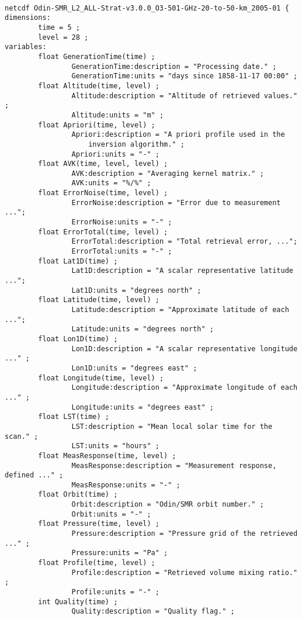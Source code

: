 \begin{verbatim}

netcdf Odin-SMR_L2_ALL-Strat-v3.0.0_O3-501-GHz-20-to-50-km_2005-01 {
dimensions:
        time = 5 ;
        level = 28 ;
variables:
        float GenerationTime(time) ;
                GenerationTime:description = "Processing date." ;
                GenerationTime:units = "days since 1858-11-17 00:00" ;
        float Altitude(time, level) ;
                Altitude:description = "Altitude of retrieved values." ;
                Altitude:units = "m" ;
        float Apriori(time, level) ;
                Apriori:description = "A priori profile used in the
                    inversion algorithm." ;
                Apriori:units = "-" ;
        float AVK(time, level, level) ;
                AVK:description = "Averaging kernel matrix." ;
                AVK:units = "%/%" ;
        float ErrorNoise(time, level) ;
                ErrorNoise:description = "Error due to measurement ...";
                ErrorNoise:units = "-" ;
        float ErrorTotal(time, level) ;
                ErrorTotal:description = "Total retrieval error, ...";
                ErrorTotal:units = "-" ;
        float Lat1D(time) ;
                Lat1D:description = "A scalar representative latitude ...";
                Lat1D:units = "degrees north" ;
        float Latitude(time, level) ;
                Latitude:description = "Approximate latitude of each ...";
                Latitude:units = "degrees north" ;
        float Lon1D(time) ;
                Lon1D:description = "A scalar representative longitude ..." ;
                Lon1D:units = "degrees east" ;
        float Longitude(time, level) ;
                Longitude:description = "Approximate longitude of each ..." ;
                Longitude:units = "degrees east" ;
        float LST(time) ;
                LST:description = "Mean local solar time for the scan." ;
                LST:units = "hours" ;
        float MeasResponse(time, level) ;
                MeasResponse:description = "Measurement response, defined ..." ;
                MeasResponse:units = "-" ;
        float Orbit(time) ;
                Orbit:description = "Odin/SMR orbit number." ;
                Orbit:units = "-" ;
        float Pressure(time, level) ;
                Pressure:description = "Pressure grid of the retrieved ..." ;
                Pressure:units = "Pa" ;
        float Profile(time, level) ;
                Profile:description = "Retrieved volume mixing ratio." ;
                Profile:units = "-" ;
        int Quality(time) ;
                Quality:description = "Quality flag." ;

\end{verbatim}

